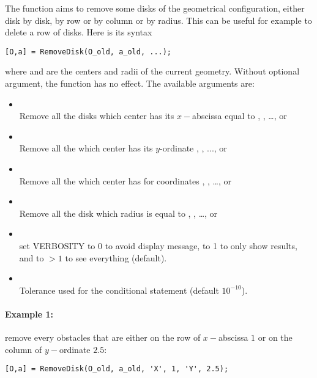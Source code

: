 The function  aims to remove some disks of the geometrical configuration, either disk by disk, by row or by column or by radius. This can be useful for example to delete a row of disks. Here is its syntax
\begin{verbatim}
[O,a] = RemoveDisk(O_old, a_old, ...);
\end{verbatim}
where  and  are the centers and radii of the current geometry. Without optional argument, the function has no effect. The available arguments are:
\begin{itemize}
\item {}\\
Remove all the disks which center has its $x-$abscissa equal to , , \ldots, or 
\item {}\\
Remove all the which center has its $y$-ordinate , , ..., or 
\item {}\\
Remove all the which center has for coordinates \code{[X1;Y1]}, \code{[X2;Y2]}, \ldots, or \code{[XN;YN]}
\item {}\\
Remove all the disk which radius is equal to , , \ldots, or 
\item {}\\
set VERBOSITY to 0 to avoid display message, to 1 to only show results, and to $>1$ to see everything (default).
\item {}\\
Tolerance used for the conditional statement (default $10^{-10}$).
\end{itemize}

\paragraph{Example 1:} remove every obstacles that are either on the row of $x-$abscissa $1$ or on the column of $y-$ordinate $2.5$:
\begin{verbatim}
[O,a] = RemoveDisk(O_old, a_old, 'X', 1, 'Y', 2.5);
\end{verbatim}
